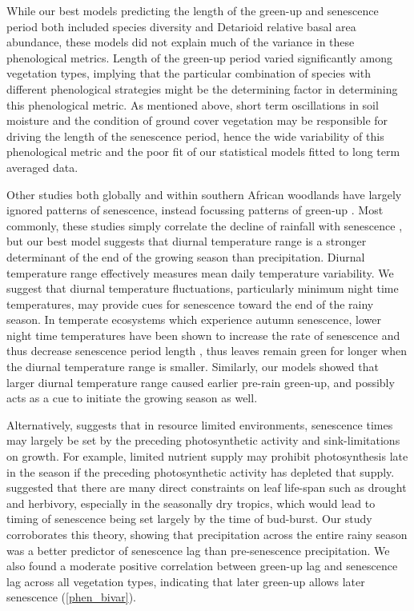 \documentclass[11pt,a4paper]{article}
\begin{document}
While our best models predicting the length of the green-up and senescence period both included species diversity and Detarioid relative basal area abundance, these models did not explain much of the variance in these phenological metrics. Length of the green-up period varied significantly among vegetation types, implying that the particular combination of species with different phenological strategies might be the determining factor in determining this phenological metric. As mentioned above, short term oscillations in soil moisture and the condition of ground cover vegetation may be responsible for driving the length of the senescence period, hence the wide variability of this phenological metric and the poor fit of our statistical models fitted to long term averaged data.

Other studies both globally and within southern African woodlands have largely ignored patterns of senescence, instead focussing patterns of green-up \citep{Gallinat2015}. Most commonly, these studies simply correlate the decline of rainfall with senescence \citep{Stevens2016, Guan2014}, but our best model suggests that diurnal temperature range is a stronger determinant of the end of the growing season than precipitation. Diurnal temperature range effectively measures mean daily temperature variability. We suggest that diurnal temperature fluctuations, particularly minimum night time temperatures, may provide cues for senescence toward the end of the rainy season. In temperate ecosystems which experience autumn senescence, lower night time temperatures have been shown to increase the rate of senescence and thus decrease senescence period length \citep{Michelson2017, Escamilla2020}, thus leaves remain green for longer when the diurnal temperature range is smaller. Similarly, our models showed that larger diurnal temperature range caused earlier pre-rain green-up, and possibly acts as a cue to initiate the growing season as well.

Alternatively, \citet{Zani2020} suggests that in resource limited environments, senescence times may largely be set by the preceding photosynthetic activity and sink-limitations on growth. For example, limited nutrient supply may prohibit photosynthesis late in the season if the preceding photosynthetic activity has depleted that supply. \citet{Reich1992} suggested that there are many direct constraints on leaf life-span such as drought and herbivory, especially in the seasonally dry tropics, which would lead to timing of senescence being set largely by the time of bud-burst. Our study corroborates this theory, showing that precipitation across the entire rainy season was a better predictor of senescence lag than pre-senescence precipitation. We also found a moderate positive correlation between green-up lag and senescence lag across all vegetation types, indicating that later green-up allows later senescence (\autoref{phen_bivar}).
\end{document}
